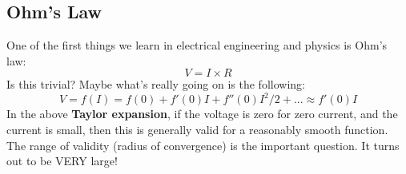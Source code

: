 \subsection{Ohm’s Law}
One of the first things we learn in electrical engineering and physics is Ohm's law:
    \begin{equation}
        V = I \times R
        \label{eq:ohms}
    \end{equation}
Is this trivial? Maybe what's really going on is the following:
    \begin{equation}
        V = f(I) = f(0) + f'(0)I + f''(0){I^2}/2 + ... \approx f'(0)I
        \label{eq:taylor_ohms}
    \end{equation}
In the above \textbf{Taylor expansion}, if the voltage is zero for zero current, and the current is small, then this is generally valid for a reasonably smooth function.   The range of validity (radius of convergence) is the important question. It turns out to be VERY large!
